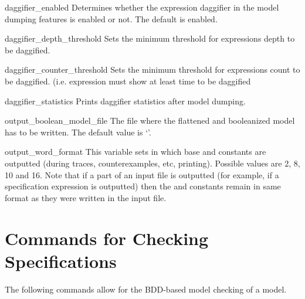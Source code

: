 \begin{nusmvVar} {daggifier\_enabled}{}{}
Determines whether the expression daggifier in the model dumping
features is enabled or not. The default is enabled.
\end{nusmvVar}

\begin{nusmvVar} {daggifier\_depth\_threshold} {} {}
Sets the minimum threshold for expressions depth to be daggified.
\end{nusmvVar}

\begin{nusmvVar} {daggifier\_counter\_threshold} {} {}
Sets the minimum threshold for expressions count to be
daggified. (i.e. expression must show at least  time to
be daggified
\end{nusmvVar}

\begin{nusmvVar} {daggifier\_statistics}{}{}
Prints daggifier statistics after model dumping.
\end{nusmvVar}


\begin{nusmvVar}{output\_boolean\_model\_file}
{}{}
The file where the flattened and booleanized model has to be written. The
default value is `'.
\end{nusmvVar}

\begin{nusmvVar}{output\_word\_format}{}
{} This variable sets in which base \UWord and \SWord
constants are outputted (during traces, counterexamples, etc,
printing). Possible values are 2, 8, 10 and 16. Note that if a part of
an input file is outputted (for example, if a specification expression
is outputted) then the \UWord and \SWord constants remain in same
format as they were written in the input file.
\end{nusmvVar}


\section{Commands for Checking Specifications}
The following commands allow for the BDD-based model checking of a
\nusmv model.





